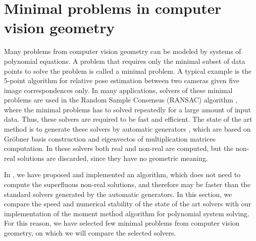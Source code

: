 \chapter{Minimal problems in computer vision geometry}
Many problems from computer vision geometry can be modeled by systems of polynomial equations.
A problem that requires only the minimal subset of data points to solve the problem is called a minimal problem.
A typical example is the 5-point algorithm \cite{5pt} for relative pose estimation between two cameras given five image correspondences only.
In many applications, solvers of these minimal problems are used in the Random Sample Consensus (RANSAC) algorithm \cite{ransac}, where the minimal problems has to solved repeatedly for a large amount of input data.
Thus, these solvers are required to be fast and efficient.
The state of the art method is to generate these solvers by automatic generators \cite{autogen}, which are based on Gr\"obner basis construction and eigenvectos of multiplication matrices computation.
In these solvers both real and non-real are computed, but the non-real solutions are discarded, since they have no geometric meaning.

In , we have proposed and implemented an algorithm, which does not need to compute the superfluous non-real solutions, and therefore may be faster than the standard solvers generated by the automatic generators.
In this section, we compare the speed and numerical stability of the state of the art solvers with our implementation of the moment method algorithm for polynomial system solving.
For this reason, we have selected few minimal problems from computer vision geometry, on which we will compare the selected solvers.
